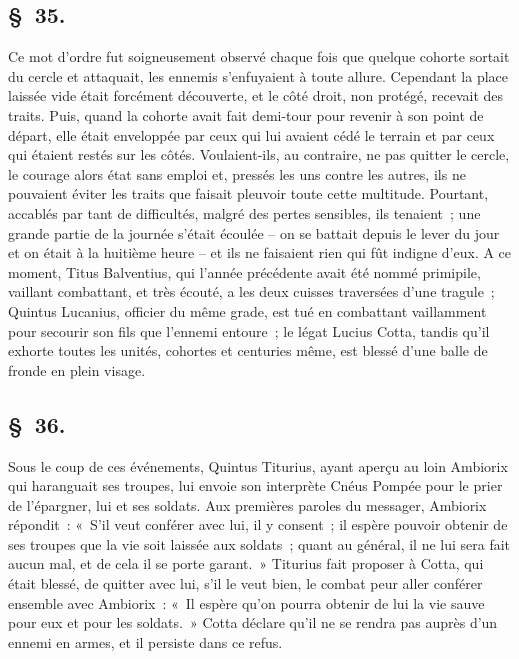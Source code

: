 \documentclass[french,twoside]{book} %
\begin{document}
\subsection[{§ 35.}]{ \textsc{§ 35.} }
\noindent Ce mot d’ordre fut soigneusement observé chaque fois que quelque cohorte sortait du cercle et attaquait, les ennemis s’enfuyaient à toute allure. Cependant la place laissée vide était forcément découverte, et le côté droit, non protégé, recevait des traits. Puis, quand la cohorte avait fait demi-tour pour revenir à son point de départ, elle était enveloppée par ceux qui lui avaient cédé le terrain et par ceux qui étaient restés sur les côtés. Voulaient-ils, au contraire, ne pas quitter le cercle, le courage alors état sans emploi et, pressés les uns contre les autres, ils ne pouvaient éviter les traits que faisait pleuvoir toute cette multitude. Pourtant, accablés par tant de difficultés, malgré des pertes sensibles, ils tenaient ; une grande partie de la journée s’était écoulée – on se battait depuis le lever du jour et on était à la huitième heure – et ils ne faisaient rien qui fût indigne d’eux. A ce moment, Titus Balventius, qui l’année précédente avait été nommé primipile, vaillant combattant, et très écouté, a les deux cuisses traversées d’une tragule ; Quintus Lucanius, officier du même grade, est tué en combattant vaillamment pour secourir son fils que l’ennemi entoure ; le légat Lucius Cotta, tandis qu’il exhorte toutes les unités, cohortes et centuries même, est blessé d’une balle de fronde en plein visage.
\subsection[{§ 36.}]{ \textsc{§ 36.} }
\noindent Sous le coup de ces événements, Quintus Titurius, ayant aperçu au loin Ambiorix qui haranguait ses troupes, lui envoie son interprète Cnéus Pompée pour le prier de l’épargner, lui et ses soldats. Aux premières paroles du messager, Ambiorix répondit : « S'il veut conférer avec lui, il y consent ; il espère pouvoir obtenir de ses troupes que la vie soit laissée aux soldats ; quant au général, il ne lui sera fait aucun mal, et de cela il se porte garant. » Titurius fait proposer à Cotta, qui était blessé, de quitter avec lui, s’il le veut bien, le combat peur aller conférer ensemble avec Ambiorix : « Il espère qu’on pourra obtenir de lui la vie sauve pour eux et pour les soldats. » Cotta déclare qu’il ne se rendra pas auprès d’un ennemi en armes, et il persiste dans ce refus.
\end{document}
